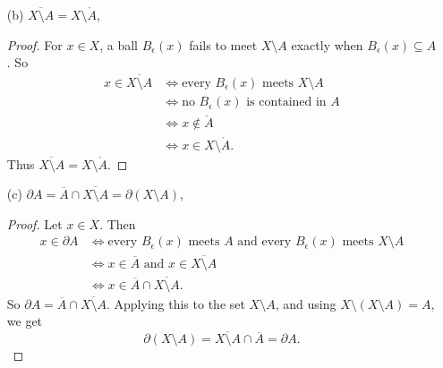 \documentclass[minion]{homework}
\begin{document}
\begin{problems}
\begin{itemize}
\begin{proof}
      Now let $x \in \overline{A} \setminus \partial A$. Since $x \in \overline{A}$, every open ball around $x$ meets $A$. Since $x \notin \partial A$, some open ball around $x$ fails to meet both $A$ and $X \setminus A$, so it must be some $B_\epsilon(x)$ that does not meet $X \setminus A$. That is, $B_\epsilon(x) \subseteq A$, so $x \in \mathring{A}$.
      Thus
      $$\mathring{A} \subseteq A \setminus \partial A \subseteq \overline{A} \setminus \partial A \subseteq \mathring{A}$$
      and all three sets are equal.
    \end{proof}
  \item[(b)] $\overline{X \setminus A} = X \setminus \mathring{A}$, \newline
    \begin{proof}
      For $x \in X$, a ball $B_\epsilon(x)$ fails to meet $X \setminus A$ exactly when $B_\epsilon(x) \subseteq A$. So
      \begin{align*}
        x \in \overline{X \setminus A} &\iff \text{every } B_\epsilon(x) \text{ meets } X \setminus A \\
                                       &\iff \text{no } B_\epsilon(x) \text{ is contained in } A \\
                                       &\iff x \notin \mathring{A} \\
                                       &\iff x \in X \setminus \mathring{A}.
      \end{align*}
      Thus $\overline{X \setminus A} = X \setminus \mathring{A}$.
    \end{proof}
  \item[(c)] $\partial A = \overline{A} \cap \overline{X \setminus A} = \partial(X \setminus A)$, \newline
    \begin{proof}
      Let $x \in X$. Then
      \begin{align*}
        x \in \partial A &\iff \text{every } B_\epsilon(x) \text{ meets } A \text{ and every } B_\epsilon(x) \text{ meets } X \setminus A \\
                         &\iff x \in \overline{A} \text{ and } x \in \overline{X \setminus A} \\
                         &\iff x \in \overline{A} \cap \overline{X \setminus A}.
      \end{align*}
      So $\partial A = \overline{A} \cap \overline{X \setminus A}$. Applying this to the set $X \setminus A$, and using $X \setminus (X \setminus A) = A$, we get
      $$\partial(X \setminus A) = \overline{X \setminus A} \cap \overline{A} = \partial A.$$

\end{proof}
\end{itemize}
\end{problems}
\end{document}
